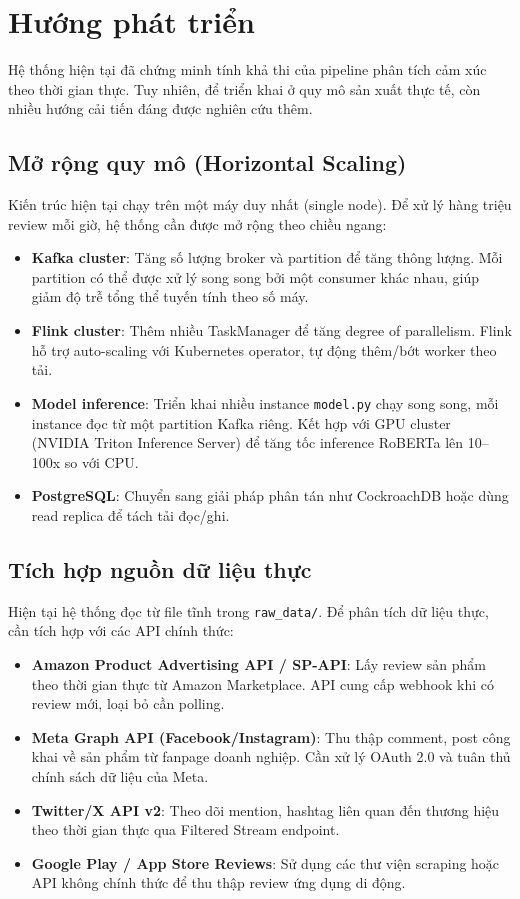 \section{Hướng phát triển}

Hệ thống hiện tại đã chứng minh tính khả thi của pipeline phân tích cảm xúc theo thời gian thực. Tuy nhiên, để triển khai ở quy mô sản xuất thực tế, còn nhiều hướng cải tiến đáng được nghiên cứu thêm.

\subsection{Mở rộng quy mô (Horizontal Scaling)}

Kiến trúc hiện tại chạy trên một máy duy nhất (single node). Để xử lý hàng triệu review mỗi giờ, hệ thống cần được mở rộng theo chiều ngang:

\begin{itemize}
    \item \textbf{Kafka cluster}: Tăng số lượng broker và partition để tăng thông lượng. Mỗi partition có thể được xử lý song song bởi một consumer khác nhau, giúp giảm độ trễ tổng thể tuyến tính theo số máy.
    \item \textbf{Flink cluster}: Thêm nhiều TaskManager để tăng degree of parallelism. Flink hỗ trợ auto-scaling với Kubernetes operator, tự động thêm/bớt worker theo tải.
    \item \textbf{Model inference}: Triển khai nhiều instance \texttt{model.py} chạy song song, mỗi instance đọc từ một partition Kafka riêng. Kết hợp với GPU cluster (NVIDIA Triton Inference Server) để tăng tốc inference RoBERTa lên 10--100x so với CPU.
    \item \textbf{PostgreSQL}: Chuyển sang giải pháp phân tán như CockroachDB hoặc dùng read replica để tách tải đọc/ghi.
\end{itemize}

\subsection{Tích hợp nguồn dữ liệu thực}

Hiện tại hệ thống đọc từ file tĩnh trong \texttt{raw\_data/}. Để phân tích dữ liệu thực, cần tích hợp với các API chính thức:

\begin{itemize}
    \item \textbf{Amazon Product Advertising API / SP-API}: Lấy review sản phẩm theo thời gian thực từ Amazon Marketplace. API cung cấp webhook khi có review mới, loại bỏ cần polling.
    \item \textbf{Meta Graph API (Facebook/Instagram)}: Thu thập comment, post công khai về sản phẩm từ fanpage doanh nghiệp. Cần xử lý OAuth 2.0 và tuân thủ chính sách dữ liệu của Meta.
    \item \textbf{Twitter/X API v2}: Theo dõi mention, hashtag liên quan đến thương hiệu theo thời gian thực qua Filtered Stream endpoint.
    \item \textbf{Google Play / App Store Reviews}: Sử dụng các thư viện scraping hoặc API không chính thức để thu thập review ứng dụng di động.
\end{itemize}


